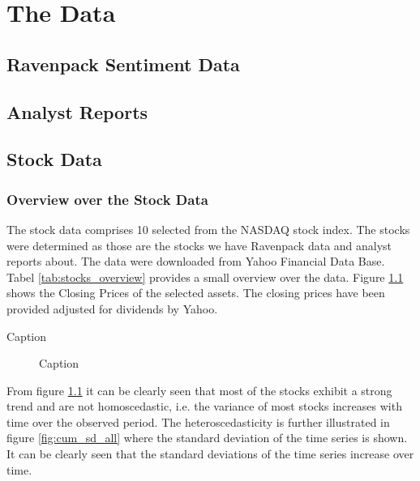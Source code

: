 \chapter{The Data}

\section{Ravenpack Sentiment Data}


\section{Analyst Reports}


\section{Stock Data}
\subsection{Overview over the Stock Data}
The stock data comprises 10 selected from the NASDAQ stock index. The stocks were determined as those are the stocks we have Ravenpack data and analyst reports about. The data were downloaded from Yahoo Financial Data Base. Tabel \ref{tab:stocks_overview} provides a small overview over the data. Figure \ref{fig:Daily Stock Prices for all Stocks in the Data Set} shows the Closing Prices of the selected assets. The closing prices have been provided adjusted for dividends by Yahoo. 

\begin{table}[]
    \centering
    \begin{adjustbox}{width = 0.9\linewidth}
    \setlength{\tabcolsep}{10pt}
    
    \end{adjustbox}
    \caption{Caption}
    \label{tab:stocks_overview}
\end{table}{}

\begin{figure}[h]
    \centering
    \begin{adjustbox}{width=.9\textwidth,center}
    
    \end{adjustbox}  
    \caption{Caption}
    \label{fig:Daily Stock Prices for all Stocks in the Data Set}
\end{figure}{}

From figure \ref{fig:Daily Stock Prices for all Stocks in the Data Set} it can be clearly seen that most of the stocks exhibit a strong trend and are not homoscedastic, i.e. the variance of most stocks increases with time over the observed period. The heteroscedasticity is further illustrated in figure \ref{fig:cum_sd_all} where the standard deviation of the time series is shown. It can be clearly seen that the standard deviations of the time series increase over time. 

